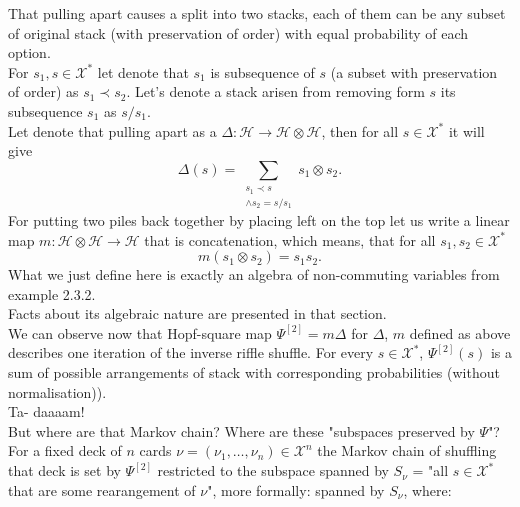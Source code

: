 \documentclass[a4paper, 12pt]{report}
\begin{document}
That pulling apart causes a split into two stacks, each of them can be any subset of original stack
(with preservation of order) with equal probability of each option. \\
For $s_1, s \in \mathcal{X}^*$ let denote that $s_1$ is subsequence of $s$ (a subset with preservation of
order) as $s_1 \prec s_2$. Let's denote a stack arisen from removing form $s$ its subsequence $s_1$ as
$s/s_1$. \\
Let denote that pulling apart as a $\Delta : \mathcal{H} \to \mathcal{H} \otimes \mathcal{H}$, then for all
$s \in \mathcal{X}^*$ it will give
\begin{equation*}
\Delta(s) = \sum_{\substack{s_1 \prec s \\ \land s_2 = s/s_1}}
s_1 \otimes s_2.
\end{equation*}
For putting two piles back together by placing left on the top let us write a linear map
$m : \mathcal{H} \otimes \mathcal{H} \to \mathcal{H}$ that is concatenation, which means, that
for all $s_1, s_2 \in \mathcal{X}^*$
\begin{equation*}
m(s_1 \otimes s_2) = s_1s_2.
\end{equation*}
What we just define here is exactly an algebra of non-commuting variables from example
2.3.2.\\
Facts about its algebraic nature are presented in that section. \\
We can observe now that Hopf-square map $\Psi^{[2]} = m\Delta$ for $\Delta$, $m$ defined as above
describes one iteration of the inverse riffle shuffle. For every $s \in \mathcal{X}^*$, $\Psi^{[2]}(s)$ is
a sum of possible arrangements of stack with corresponding probabilities (without normalisation)).
\\ Ta- daaaam! \\[4pt]
But where are that Markov chain? Where are these "subspaces preserved by $\Psi$"? \\
For a fixed deck of $n$ cards $\nu = (\nu_1, \dots, \nu_n) \in \mathcal{X}^n$ the Markov chain of shuffling
that deck is set by $\Psi^{[2]}$ restricted to the subspace spanned by $S_\nu$ = "all $s \in \mathcal{X}^*$
that are some rearangement of $\nu$", more formally: spanned by $S_\nu$, where:
\end{document}
